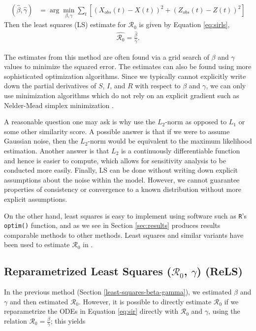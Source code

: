 \documentclass[12pt]{article}
\newcommand{\rr}{\ensuremath{\mathcal{R}_0}}
\begin{document}
\begin{align*}
(\hat{\beta}, \hat{\gamma} )&=\arg \min_{\beta, \gamma} \sum_{t} \left [ \left (X_{obs}(t) - X(t)\right )^2 + \left ( Z_{obs}(t) - Z(t) \right )^2 \right ]
\end{align*}
Then the least squares (LS) estimate for $\rr$ is given by Equation \ref{eq:sirls},
\begin{align}\label{eq:sirls}
  \hat{\rr}= \frac{\hat{\beta}}{\hat{\gamma}}.
\end{align}

The estimates from this method are often found via a grid search of $\beta$ and $\gamma$ values to minimize the squared error.  The estimates can also be found using more sophisticated optimization algorithms. Since we typically cannot explicitly write down the partial derivatives of $S$, $I$, and $R$ with respect to $\beta$ and $\gamma$, we can only use minimization algorithms which do not rely on an explicit gradient such as Nelder-Mead simplex minimization \citep{nelder-mead1965}.

A reasonable question one may ask is why use the $L_2$-norm as opposed to $L_1$ or some other similarity score.  A possible answer is that if we were to assume Gaussian noise, then the $L_2$-norm would be equivalent to the maximum likelihood estimation.  Another answer is that $L_2$ is a continuously differentiable function and hence is easier to compute, which allows for sensitivity analysis to  be conducted more easily.  Finally, LS can be done without writing down explicit assumptions about the noise within the model.  However, we cannot guarantee properties of consistency or convergence to a known distribution without more explicit assumptions.  

On the other hand, least squares is easy to implement using software such as \texttt{R}'s \texttt{optim()} function, and as we see in Section \ref{sec:results} produces results comparable methods to other methods.  Least squares and similar variants have been used to estimate $\rr$ in \cite{majumder2016}.

\subsection{Reparametrized Least Squares ($\rr$, $\gamma$) (ReLS)}\label{reparametrized-least-squares-rux5f0-gamma}

In the previous method (Section \ref{least-squares-beta-gamma}), we estimated $\beta$ and $\gamma$ and then estimated $\rr$.  However, it is possible to directly estimate $\rr$ if we reparametrize the ODEs in Equation \eqref{eq:sir} directly with \(\rr\) and \(\gamma\), using the relation $\rr = \frac{\beta}{\gamma}$; this yields
\end{document}
